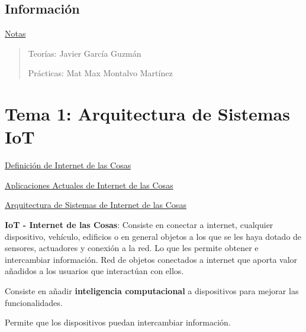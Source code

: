 \documentclass[12pt]{report} %
\begin{document}
\listoffigures
\thispagestyle{fancy}

\listoftables
\thispagestyle{fancy}

\clearpage
{} %




\section{Información}

\href{https://www.notion.so/Notas-2607b92b49e64106afd141326b010798}{Notas}

\begin{quote}
Teorías: Javier García Guzmán

Prácticas: Mat Max Montalvo Martínez
\end{quote}

\chapter{Tema 1: Arquitectura de Sistemas
IoT}

\href{https://learning.oreilly.com/library/view/internet-of-things/9781788470599/a7f866bd-4ac8-47f3-a175-0f10d91a5ce2.xhtml}{Definición
de Internet de las Cosas}

\href{https://learning.oreilly.com/library/view/internet-of-things/9781119456742/part04.xhtml\#part}{Aplicaciones
Actuales de Internet de las Cosas}

\href{https://learning.oreilly.com/library/view/build-your-own/9781484244982/html/474034_1_En_2_Chapter.xhtml}{Arquitectura
de Sistemas de Internet de las Cosas}

\textbf{IoT - Internet de las Cosas}: Consiste en conectar a internet,
cualquier dispositivo, vehículo, edificios o en general objetos a los
que se les haya dotado de sensores, actuadores y conexión a la red. Lo
que les permite obtener e intercambiar información. Red de objetos
conectados a internet que aporta valor añadidos a los usuarios que
interactúan con ellos.

Consiste en añadir \textbf{inteligencia computacional} a dispositivos
para mejorar las funcionalidades.

Permite que los dispositivos puedan intercambiar información.
\end{document}
